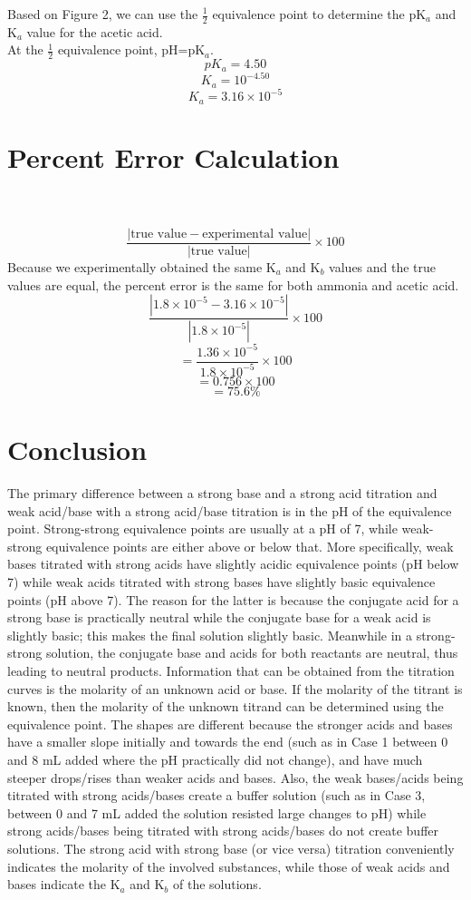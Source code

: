 \documentclass[10pt, letterpaper]{article}
\begin{document}
Based on Figure 2, we can use the $\frac{1}{2}$ equivalence point to determine the pK$_{a}$ and K$_{a}$ value for the acetic acid.
\\
At the $\frac{1}{2}$ equivalence point, pH=pK$_{a}$.
$$pK_{a}=4.50$$
$$K_{a}=10^{-4.50}$$
$$K_{a}=3.16\times 10^{-5}$$

\section{Percent Error Calculation}
\\
\\
\begin{equation}
\frac{|\text{true value}-\text{experimental value}|}{|\text{true value}|}\times 100
\end{equation}
Because we experimentally obtained the same K$_{a}$ and K$_{b}$ values and the true values are equal, the percent error is the same for both ammonia and acetic acid.
$$\frac{|1.8\times10^{-5}-3.16\times10^{-5}|}{|1.8\times10^{-5}|}\times 100$$
$$=\frac{1.36\times10^{-5}}{1.8\times10^{-5}}\times 100$$
$$=0.756\times 100$$
$$=75.6\%$$
\clearpage
\section{Conclusion}
The primary difference between a strong base and a strong acid titration and weak acid/base with a strong acid/base titration is in the pH of the equivalence point. Strong-strong equivalence points are usually at a pH of 7, while weak-strong equivalence points are either above or below that. More specifically, weak bases titrated with strong acids have slightly acidic equivalence points (pH below 7) while weak acids titrated with strong bases have slightly basic equivalence points (pH above 7). The reason for the latter is because the conjugate acid for a strong base is practically neutral while the conjugate base for a weak acid is slightly basic; this makes the final solution slightly basic. Meanwhile in a strong-strong solution, the conjugate base and acids for both reactants are neutral, thus leading to neutral products. Information that can be obtained from the titration curves is the molarity of an unknown acid or base. If the molarity of the titrant is known, then the molarity of the unknown titrand can be determined using the equivalence point. The shapes are different because the stronger acids and bases have a smaller slope initially and towards the end (such as in Case 1 between 0 and 8 mL added where the pH practically did not change), and have much steeper drops/rises than weaker acids and bases. Also, the weak bases/acids being titrated with strong acids/bases create a buffer solution (such as in Case 3, between 0 and 7 mL added the solution resisted large changes to pH) while strong acids/bases being titrated with strong acids/bases do not create buffer solutions. The strong acid with strong base (or vice versa) titration conveniently indicates the molarity of the involved substances, while those of weak acids and bases indicate the K$_{a}$ and K$_{b}$ of the solutions.
\end{document}
